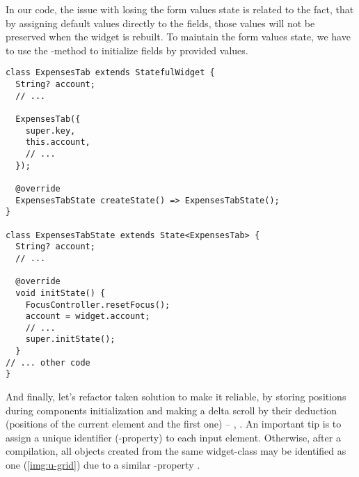 In our code, the issue with losing the form values state is related to the fact, that by assigning default values 
directly to the fields, those values will not be preserved when the widget is rebuilt. To maintain the form values 
state, we have to use the -method to initialize fields by provided values.

\begin{lstlisting}
class ExpensesTab extends StatefulWidget {
  String? account;
  // ...

  ExpensesTab({
    super.key,
    this.account,
    // ...
  });

  @override
  ExpensesTabState createState() => ExpensesTabState();
}

class ExpensesTabState extends State<ExpensesTab> {
  String? account;
  // ...

  @override
  void initState() {
    FocusController.resetFocus();
    account = widget.account;
    // ...
    super.initState();
  }
// ... other code
}
\end{lstlisting}

\noindent And finally, let's refactor taken solution to make it reliable, by storing positions during components 
initialization and making a delta scroll by their deduction (positions of the current element and the first one) -- 
, . An important tip is to assign a unique identifier (-property) to each input 
element. Otherwise, after a compilation, all objects created from the same widget-class may be identified as one 
(\cref{img:u-grid}) due to a similar -property  .

